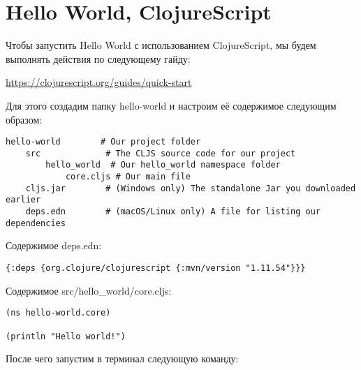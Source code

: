 

\section*{Hello World, ClojureScript}

Чтобы запустить Hello World с использованием ClojureScript, мы будем выполнять действия по следующему гайду:

\url{https://clojurescript.org/guides/quick-start}

Для этого создадим папку hello-world и настроим её содержимое следующим образом: 

\clearpage

\begin{center}
	\captionsetup{justification=raggedright,singlelinecheck=off}
	\begin{lstlisting}[label=lst:clojurehelloworld,caption=ClojureScirpt, Hello World]
hello-world        # Our project folder
	src             # The CLJS source code for our project
		hello_world  # Our hello_world namespace folder
			core.cljs # Our main file
	cljs.jar        # (Windows only) The standalone Jar you downloaded earlier
	deps.edn        # (macOS/Linux only) A file for listing our dependencies
	\end{lstlisting}
\end{center}

Содержимое deps.edn:

\begin{center}
	\captionsetup{justification=raggedright,singlelinecheck=off}
	\begin{lstlisting}[label=lst:clojurehelloworld-1,caption=Содержимое deps.edn]
{:deps {org.clojure/clojurescript {:mvn/version "1.11.54"}}}
	\end{lstlisting}
\end{center}

Содержимое src/hello\_world/core.cljs:

\begin{center}
	\captionsetup{justification=raggedright,singlelinecheck=off}
	\begin{lstlisting}[label=lst:clojurehelloworld-1,caption=Содержимое src/hello\_world/core.cljs]
(ns hello-world.core)

(println "Hello world!")
	\end{lstlisting}
\end{center}

После чего запустим в терминал следующую команду:

